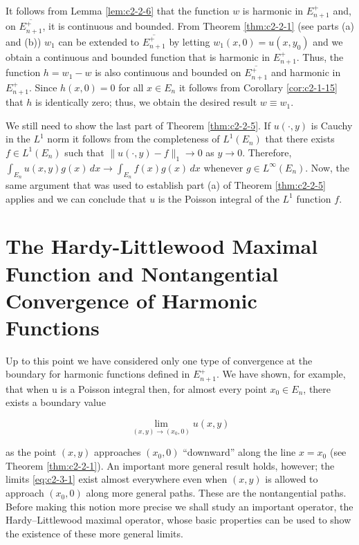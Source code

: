 It follows from Lemma \ref{lem:c2-2-6} that the function $w$ is harmonic in $E_{n+1}^{+}$ and, on $\overline{E_{n+1}^{+}}$, it is continuous and bounded. From Theorem \ref{thm:c2-2-1} (see parts (a) and (b)) $w_{1}$ can be extended to $\overline{E_{n+1}^{+}}$ by letting $w_{1}(x,0)=u(x,y_{0})$ and we obtain a continuous and bounded function that is harmonic in $E_{n+1}^{+}$. Thus, the function $h=w_{1}-w$ is also continuous and bounded on $\overline{E_{n+1}^{+}}$ and harmonic in $E_{n+1}^{+}$. Since $h(x,0)=0$ for all $x\in E_{n}$ it follows from Corollary \ref{cor:c2-1-15} that $h$ is identically zero; thus, we obtain the desired result $w\equiv w_{1}$.

We still need to show the last part of Theorem \ref{thm:c2-2-5}. If $u(\cdot, y)$ is Cauchy in the $L^1$ norm it follows from the completeness of $L^1(E_n)$ that there exists $f \in L^1(E_n)$ such that $\|u(\cdot, y) - f\|_1 \to 0$ as $y \to 0$. Therefore, $\int_{E_n} u(x, y) g(x) \, dx \to \int_{E_n} f(x) g(x) \, dx$ whenever $g \in L^\infty(E_n)$. Now, the same argument that was used to establish part (a) of Theorem \ref{thm:c2-2-5} applies and we can conclude that $u$ is the Poisson integral of the $L^1$ function $f$.

\section{The Hardy-Littlewood Maximal Function and Nontangential Convergence of Harmonic Functions}

Up to this point we have considered only one type of convergence at the boundary for harmonic functions defined in $E_{n+1}^{+}$. We have shown, for example, that when u is a Poisson integral then, for almost every point $x_0 \in E_n$, there exists a boundary value

\begin{equation}\label{eq:c2-3-1}
\lim\limits_{(x,y)\to(x_{0},0)}u(x,y)
\end{equation}

as the point $(x, y)$ approaches $(x_0, 0)$ ``downward'' along the line $x = x_0$ (see Theorem \ref{thm:c2-2-1}). An important more general result holds, however; the limits \eqref{eq:c2-3-1} exist almost everywhere even when $(x, y)$ is allowed to approach $(x_0, 0)$ along more general paths. These are the nontangential paths. Before making this notion more precise we shall study an important operator, the Hardy--Littlewood maximal operator, whose basic properties can be used to show the existence of these more general limits.

